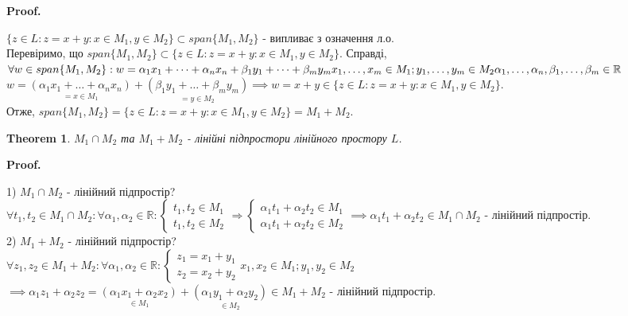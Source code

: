 \documentclass[a4paper, 10pt]{article}
\makeatletter
\theoremstyle{theoremdd}
\newtheorem{theorem}{Theorem}[subsection]
\renewenvironment{proof}[1][Proof.\\]{\par
\pushQED{\hfill \qed}%
\normalfont \topsep6\p@\@plus6\p@\relax
\trivlist
\item\relax
{\bfseries
#1\@addpunct{.}}\hspace\labelsep\ignorespaces
}{%
\popQED\endtrivlist\@endpefalse
}
\makeatother
\begin{document}
	\begin{proof}
	$\{z \in L: z = x+y: x \in M_1, y \in M_2\} \subset span\{M_1, M_2\}$ - випливає з означення л.о.\\
	Перевіримо, що $span\{M_1, M_2\} \subset \{z \in L: z = x+y: x \in M_1, y \in M_2\}$. Справді,\\
	$\forall w \in span\{M_1, M_2\}: w = \alpha_1 x_1 + \dots + \alpha_n x_n + \beta_1 y_1 + \dots + \beta_m y_m \\ x_1, \dots, x_m \in M_1; y_1, \dots, y_m \in M_2 \\ \alpha_1, \dots, \alpha_n, \beta_1, \dots, \beta_m \in \mathbb{R}$\\
	$w = \underset{= x \in M_1}{(\alpha_1 x_1 + \dots + \alpha_n x_n )}+ \underset{= y \in M_2}{(\beta_1 y_1 + \dots + \beta_m y_m)} \implies w = x + y \in \{z \in L: z = x+y: x \in M_1, y \in M_2\}$.\\
	Отже, $span\{M_1, M_2\} = \{z \in L: z = x+y: x \in M_1, y \in M_2\} = M_1 + M_2$.
	\end{proof}
	
	\begin{theorem}
	$M_1 \cap M_2$ та $M_1 + M_2$ - лінійні підпростори лінійного простору $L$.
	\end{theorem}
	
	\begin{proof}
	1) $M_1 \cap M_2$ - лінійний підпростір?\\
	$\forall t_1, t_2 \in M_1 \cap M_2: \forall \alpha_1, \alpha_2 \in \mathbb{R}: \begin{cases} t_1, t_2 \in M_1 \\ t_1, t_2 \in M_2 \end{cases} \Rightarrow \begin{cases} \alpha_1 t_1 + \alpha_2 t_2 \in M_1 \\ \alpha_1 t_1 + \alpha_2 t_2 \in M_2 \end{cases} \implies \alpha_1 t_1 + \alpha_2 t_2 \in M_1 \cap M_2$ - лінійний підпростір.
	\bigskip \\
	2) $M_1 + M_2$ - лінійний підпростір?\\
	$\forall z_1, z_2 \in M_1 + M_2: \forall \alpha_1, \alpha_2 \in \mathbb{R}: \begin{cases} z_1 = x_1 + y_1 \\ z_2 = x_2 + y_2 \end{cases}x_1,x_2 \in M_1; y_1, y_2 \in M_2$\\
	$\implies \alpha_1 z_1 + \alpha_2 z_2 = \underset{\in M_1}{(\alpha_1 x_1 + \alpha_2 x_2)} + \underset{\in M_2}{(\alpha_1 y_1 + \alpha_2 y_2)} \in M_1 + M_2$ - лінійний підпростір.
	\end{proof}
	
\end{document}
